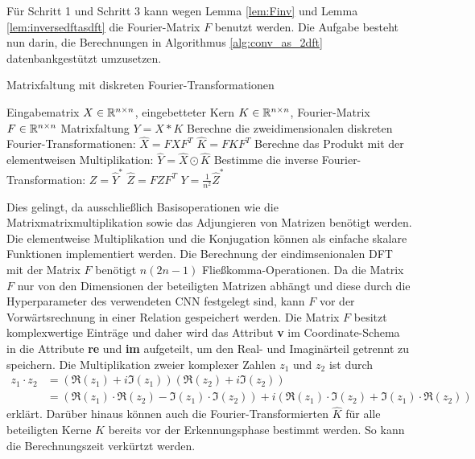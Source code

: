 Für Schritt 1 und Schritt 3 kann wegen Lemma \ref{lem:Finv} und Lemma \ref{lem:inversedftasdft} die Fourier-Matrix $F$ benutzt werden. Die Aufgabe besteht nun darin, die Berechnungen in Algorithmus \ref{alg:conv_as_2dft} datenbankgestützt umzusetzen. 
\begin{algorithm}[h]
    \caption{Matrixfaltung mit diskreten Fourier-Transformationen}
    \label{alg:conv_as_2dft}
    \begin{algorithmic}
    \Require  Eingabematrix $X \in \mathbb{R}^{n \times n}$, eingebetteter Kern $K \in \mathbb{R}^{n \times n}$, Fourier-Matrix $F \in \mathbb{R}^{n \times n}$ 
    \Ensure Matrixfaltung $Y= X \ast K$
    \State Berechne die zweidimensionalen diskreten Fourier-Transformationen:
    \State $\hat{X}=F X F^T$
    \State $\hat{K}=F K F^T$ 
    \State Berechne das Produkt mit der elementweisen Multiplikation:
    \State $\hat{Y}= \hat{X} \odot \hat{K}$
    \State Bestimme die inverse Fourier-Transformation:  
    \State $Z=\hat{Y}^*$
    \State $\hat{Z}=F Z F^T$
    \State $Y=\frac{1}{n^2}\hat{Z}^*$
    \end{algorithmic}
\end{algorithm}

Dies gelingt, da ausschließlich Basisoperationen wie die Matrixmatrixmultiplikation sowie das Adjungieren von Matrizen benötigt werden. Die elementweise Multiplikation und die Konjugation können als einfache skalare Funktionen implementiert werden. Die Berechnung der eindimsenionalen DFT mit der Matrix $F$ benötigt $n(2n-1)$ Fließkomma-Operationen. Da die Matrix $F$ nur von den Dimensionen der beteiligten Matrizen abhängt und diese durch die Hyperparameter des verwendeten CNN festgelegt sind, kann $F$ vor der Vorwärtsrechnung in einer Relation gespeichert werden. 
Die Matrix $F$ besitzt komplexwertige Einträge und daher wird das Attribut \textbf{v} im Coordinate-Schema in die Attribute \textbf{re} und \textbf{im} aufgeteilt, um den Real- und Imaginärteil getrennt zu speichern. Die Multiplikation zweier komplexer Zahlen $z_1$ und $z_2$ ist durch
\begin{align*}
    z_1 \cdot z_2 &=(\Re(z_1)+ i \Im(z_1))(\Re(z_2)+i \Im(z_2))\\
    &=(\Re(z_1) \cdot \Re(z_2)-\Im(z_1) \cdot \Im(z_2))+ i (\Re(z_1) \cdot \Im(z_2)+ \Im(z_1) \cdot \Re(z_2))
\end{align*}
erklärt.
Darüber hinaus können auch die Fourier-Transformierten $\hat{K}$ für alle beteiligten Kerne $K$ bereits vor der Erkennungsphase bestimmt werden. So kann die Berechnungszeit verkürtzt werden.

